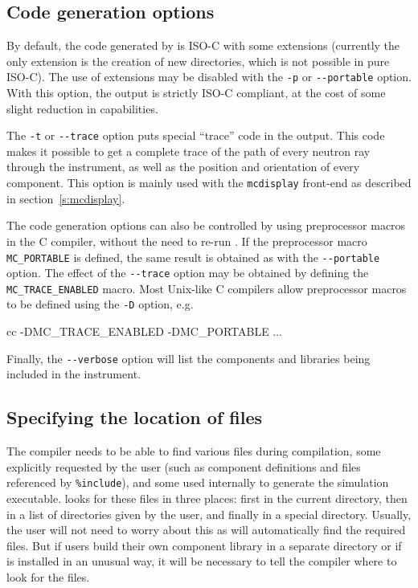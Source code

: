 \subsection{Code generation options}

By default, the code generated by \mcs is ISO-C with
some extensions (currently the only extension is the creation of new
directories, which is not possible in pure ISO-C). The use of
extensions may be disabled with the \verb+-p+ or \verb+--portable+
option. With this option, the output is strictly ISO-C compliant, at
the cost of some slight reduction in capabilities.

The \verb+-t+ or \verb+--trace+ option puts special ``trace'' code in
the output. This code makes it possible to get a complete trace of the
path of every neutron ray through the instrument, as well as the position
and orientation of every component. This option is mainly used with the
\verb+mcdisplay+ front-end as described in section~\ref{s:mcdisplay}.

The code generation options can also be controlled by using preprocessor
macros in the C compiler, without the need to re-run \mcs.
If the preprocessor macro \verb+MC_PORTABLE+ is defined, the
same result is obtained as with the \verb+--portable+ option.
The effect of the \verb+--trace+ option may be obtained
by defining the \verb+MC_TRACE_ENABLED+ macro. Most Unix-like C
compilers allow preprocessor macros to be defined using the \verb+-D+
option, e.g.
\begin{bash}
    cc -DMC_TRACE_ENABLED -DMC_PORTABLE ...
\end{bash}
Finally, the \verb+--verbose+ option will list the components and libraries being
included in the instrument.

\subsection{Specifying the location of files}
\label{s:files}

The \MCS compiler \mcs
needs to be able to find various files during compilation,
some explicitly requested by the user (such as component definitions and files
referenced by \verb+%include+), 
and some used internally to generate the simulation executable.
\MCS looks for
these files in three places: first in the current directory, then in a list of
directories given by the user, and finally in a special \MCS directory.
Usually, the user will not need to worry about this as \mcs will
automatically find the required files. But if users build their own component
library in a separate directory or if \mcs is installed in an unusual way, it
will be necessary to tell the compiler where to look for the files.


